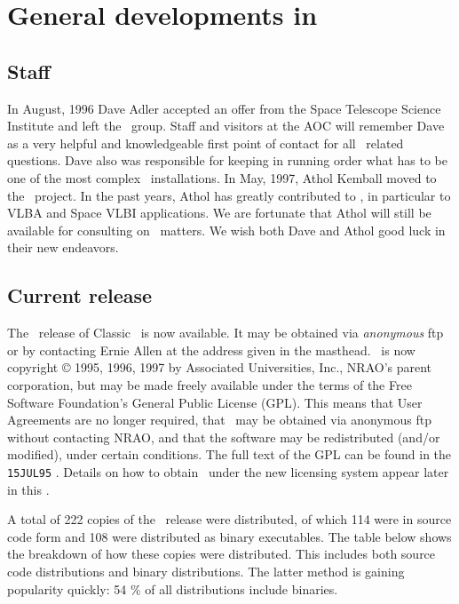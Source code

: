 \section{General developments in \AIPS}

\subsection{Staff}

In August, 1996 Dave Adler accepted an offer from the Space Telescope
Science Institute and left the \AIPS\ group.  Staff and visitors at
the AOC will remember Dave as a very helpful and knowledgeable first
point of contact for all \AIPS\ related questions.  Dave also was
responsible for keeping in running order what has to be one of the
most complex \AIPS\ installations.  In May, 1997, Athol Kemball moved
to the \AIPTOO\ project.  In the past years, Athol has greatly
contributed to \AIPS, in particular to VLBA and Space VLBI
applications.  We are fortunate that Athol will still be available for
consulting on \AIPS\ matters.  We wish both Dave and Athol good luck
in their new endeavors.

\subsection{Current release}

The \RELEASENAME\ release of Classic \AIPS\ is now available.  It may
be obtained via {\it anonymous} ftp or by contacting Ernie Allen at
the address given in the masthead.  \AIPS\ is now copyright \copyright
1995, 1996, 1997 by Associated Universities, Inc., NRAO's parent
corporation, but may be made freely available under the terms of the
Free Software Foundation's General Public License \hbox{(GPL)}.  This
means that User Agreements are no longer required, that \AIPS\ may be
obtained via anonymous ftp without contacting NRAO, and that the
software may be redistributed (and/or modified), under certain
conditions.  The full text of the GPL can be found in the {\tt
15JUL95} \Aipsletter. Details on how to obtain \AIPS\ under the new
licensing system appear later in this \Aipsletter.

A total of 222 copies of the \OLDNAME\ release were distributed, of
which 114 were in source code form and 108 were distributed as binary
executables.  The table below shows the breakdown of how these copies
were distributed. This includes both source code distributions and
binary distributions. The latter method is gaining popularity quickly:
54 \% of all distributions include binaries.

